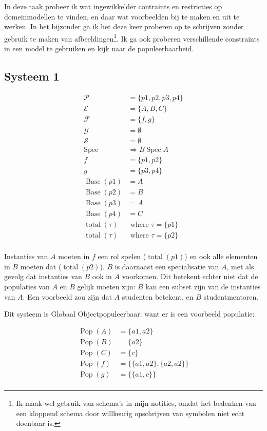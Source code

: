 \documentclass[10pt]{article}
\newcommand{\Spec}{\ensuremath{\operatorname{Spec}}}
\newcommand{\Base}{\ensuremath{\operatorname{Base}}}
\newcommand{\total}{\ensuremath{\operatorname{total}}}
\newcommand{\Pop}{\ensuremath{\operatorname{Pop}}}
\begin{document}
In deze taak probeer ik wat ingewikkelder contraints en restricties op
domeinmodellen te vinden, en daar wat voorbeelden bij te maken en uit te
werken. In het bijzonder ga ik het deze keer proberen op te schrijven zonder
gebruik te maken van afbeeldingen\footnote{Ik maak wel gebruik van schema's in
mijn notities, omdat het bedenken van een kloppend schema door willkeurig
opschrijven van symbolen niet echt doenbaar is.}. Ik ga ook proberen
verschillende constraints in een model te gebruiken en kijk naar de
populeerbaarheid.

\subsection{Systeem 1}
\begin{align*}
  \mathcal{P}    & = \{p1,p2,p3,p4\}\\
  \mathcal{E} & = \{A,B,C\} \\
  \mathcal{F} & = \{f,g\}   \\
  \mathcal{G} & = \emptyset        \\  
  \mathcal{S} & = \emptyset        \\
  \Spec       &\Rightarrow B \Spec A       \\
  f           & = \{p1,p2\} \\   
  g           & = \{p3,p4\} \\
  \Base (p1)   & = A         \\
  \Base (p2)   & = B         \\
  \Base (p3)   & = A         \\
  \Base (p4)   & = C        \\ 
  \total (\tau) &\text{ where } \tau = \{p1\} \\
  \total (\tau) &\text{ where } \tau = \{p2\} \\
\end{align*}

Instanties van $A$ moeten in $f$ een rol spelen ($\total (p1)$) en ook alle
elementen in $B$ moeten dat ($\total (p2)$). $B$ is daarnaast een specialisatie
van $A$, met als gevolg dat instanties van $B$ ook in $A$ voorkomen. Dit
betekent echter niet dat de populaties van $A$ en $B$ gelijk moeten zijn: $B$
kan een subset zijn van de instanties van $A$. Een voorbeeld zou zijn dat $A$
studenten betekent, en $B$ studentmentoren.

Dit systeem is Globaal Objectpopuleerbaar: want er is een voorbeeld populatie:

\begin{align*}
  \Pop (A) & = \{a1,a2\}                 \\
  \Pop (B) & = \{a2\}                    \\
  \Pop (C) & = \{c\}                     \\
  \Pop (f) & = \{ \{a1,a2\}, \{a2,a2\}\} \\
  \Pop (g) & = \{ \{a1,c \} \}           \\
\end{align*}
\end{document}
